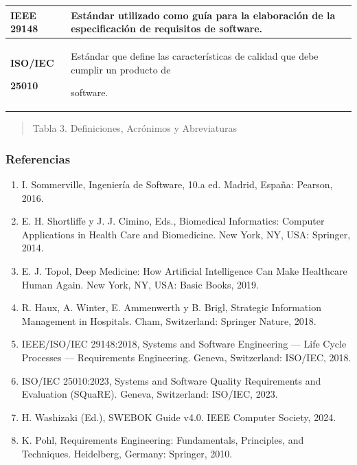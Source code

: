 \documentclass[
]{article}
\newcounter{none} %
\begin{document}
{\def\LTcaptype{none} %
\begin{longtable}[]{@{}
  >{\raggedright\arraybackslash}p{}
  >{\raggedright\arraybackslash}p{}@{}}
\toprule\noalign{}
\begin{minipage}[b]{\linewidth}\raggedright
\textbf{IEEE 29148}
\end{minipage} & \begin{minipage}[b]{\linewidth}\raggedright
Estándar utilizado como guía para la elaboración de la especificación de
requisitos de software.
\end{minipage} \\
\midrule\noalign{}
\endhead
\bottomrule\noalign{}
\endlastfoot
\textbf{ISO/IEC}

\textbf{25010} & Estándar que define las características de calidad que
debe cumplir un producto de

software. \\
\end{longtable}
}

\begin{quote}
\protect{}\label{_bookmark8}{}Tabla 3. Definiciones,
Acrónimos y Abreviaturas
\end{quote}

\subsubsection{Referencias}\label{referencias}

\begin{enumerate}
\def\labelenumi{\arabic{enumi}.}
\item
  I. Sommerville, Ingeniería de Software, 10.a ed. Madrid, España:
  Pearson, 2016.
\item
  E. H. Shortliffe y J. J. Cimino, Eds., Biomedical Informatics:
  Computer Applications in Health Care and Biomedicine. New York, NY,
  USA: Springer, 2014.
\item
  E. J. Topol, Deep Medicine: How Artificial Intelligence Can Make
  Healthcare Human Again. New York, NY, USA: Basic Books, 2019.
\item
  R. Haux, A. Winter, E. Ammenwerth y B. Brigl, Strategic Information
  Management in Hospitals. Cham, Switzerland: Springer Nature, 2018.
\item
  IEEE/ISO/IEC 29148:2018, Systems and Software Engineering --- Life
  Cycle Processes --- Requirements Engineering. Geneva, Switzerland:
  ISO/IEC, 2018.
\item
  ISO/IEC 25010:2023, Systems and Software Quality Requirements and
  Evaluation (SQuaRE). Geneva, Switzerland: ISO/IEC, 2023.
\item
  H. Washizaki (Ed.), SWEBOK Guide v4.0. IEEE Computer Society, 2024.
\item
  K. Pohl, Requirements Engineering: Fundamentals, Principles, and
  Techniques. Heidelberg, Germany: Springer, 2010.
\end{enumerate}
\end{document}
